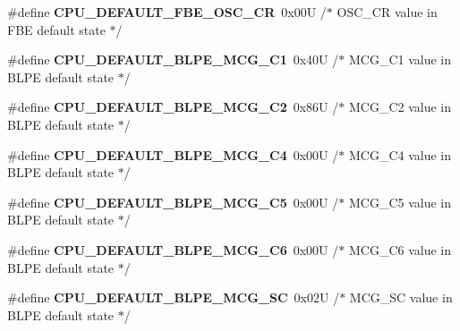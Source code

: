 \begin{DoxyCompactItemize}
\item 
\#define {\bfseries C\+P\+U\+\_\+\+D\+E\+F\+A\+U\+L\+T\+\_\+\+F\+B\+E\+\_\+\+O\+S\+C\+\_\+\+CR}~0x00\+U     /$\ast$ O\+S\+C\+\_\+\+C\+R value in F\+B\+E default state $\ast$/\hypertarget{group___c_p_u___config__module_ga7d54d023da7033c2d78ac1d5c8ebadf9}{}\label{group___c_p_u___config__module_ga7d54d023da7033c2d78ac1d5c8ebadf9}

\item 
\#define {\bfseries C\+P\+U\+\_\+\+D\+E\+F\+A\+U\+L\+T\+\_\+\+B\+L\+P\+E\+\_\+\+M\+C\+G\+\_\+\+C1}~0x40\+U     /$\ast$ M\+C\+G\+\_\+\+C1 value in B\+L\+P\+E default state $\ast$/\hypertarget{group___c_p_u___config__module_ga09f6add14a55c859ecc35da94eafed66}{}\label{group___c_p_u___config__module_ga09f6add14a55c859ecc35da94eafed66}

\item 
\#define {\bfseries C\+P\+U\+\_\+\+D\+E\+F\+A\+U\+L\+T\+\_\+\+B\+L\+P\+E\+\_\+\+M\+C\+G\+\_\+\+C2}~0x86\+U     /$\ast$ M\+C\+G\+\_\+\+C2 value in B\+L\+P\+E default state $\ast$/\hypertarget{group___c_p_u___config__module_ga21becd33faf0e1132c02281272b40dfe}{}\label{group___c_p_u___config__module_ga21becd33faf0e1132c02281272b40dfe}

\item 
\#define {\bfseries C\+P\+U\+\_\+\+D\+E\+F\+A\+U\+L\+T\+\_\+\+B\+L\+P\+E\+\_\+\+M\+C\+G\+\_\+\+C4}~0x00\+U     /$\ast$ M\+C\+G\+\_\+\+C4 value in B\+L\+P\+E default state $\ast$/\hypertarget{group___c_p_u___config__module_ga2be41c6fd1815cf784af66b6a470d38d}{}\label{group___c_p_u___config__module_ga2be41c6fd1815cf784af66b6a470d38d}

\item 
\#define {\bfseries C\+P\+U\+\_\+\+D\+E\+F\+A\+U\+L\+T\+\_\+\+B\+L\+P\+E\+\_\+\+M\+C\+G\+\_\+\+C5}~0x00\+U     /$\ast$ M\+C\+G\+\_\+\+C5 value in B\+L\+P\+E default state $\ast$/\hypertarget{group___c_p_u___config__module_gacd053664d2ad62ff4a5c4ab55c8fb8fa}{}\label{group___c_p_u___config__module_gacd053664d2ad62ff4a5c4ab55c8fb8fa}

\item 
\#define {\bfseries C\+P\+U\+\_\+\+D\+E\+F\+A\+U\+L\+T\+\_\+\+B\+L\+P\+E\+\_\+\+M\+C\+G\+\_\+\+C6}~0x00\+U     /$\ast$ M\+C\+G\+\_\+\+C6 value in B\+L\+P\+E default state $\ast$/\hypertarget{group___c_p_u___config__module_gaa014e046487b6c4caa23ac001efdf1d1}{}\label{group___c_p_u___config__module_gaa014e046487b6c4caa23ac001efdf1d1}

\item 
\#define {\bfseries C\+P\+U\+\_\+\+D\+E\+F\+A\+U\+L\+T\+\_\+\+B\+L\+P\+E\+\_\+\+M\+C\+G\+\_\+\+SC}~0x02\+U     /$\ast$ M\+C\+G\+\_\+\+S\+C value in B\+L\+P\+E default state $\ast$/\hypertarget{group___c_p_u___config__module_ga053960355ed737b8e324b4e9e95482bc}{}\label{group___c_p_u___config__module_ga053960355ed737b8e324b4e9e95482bc}


\end{DoxyCompactItemize}
